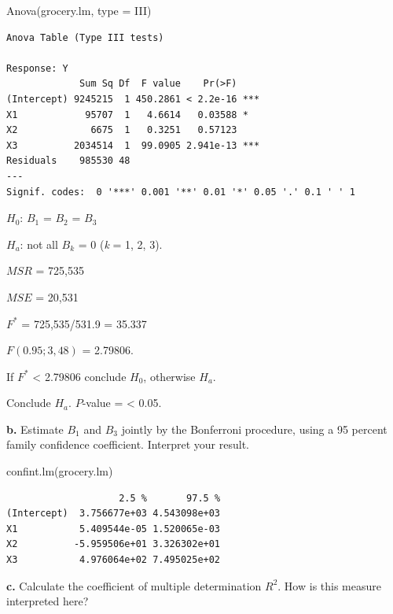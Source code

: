 \documentclass[
  letterpaper,
  DIV=11,
  numbers=noendperiod]{scrartcl}
\newenvironment{Shaded}{\begin{snugshade}}{\end{snugshade}}
\newcommand{\AttributeTok}[1]{\textcolor[rgb]{0.40,0.45,0.13}{#1}}
\newcommand{\FunctionTok}[1]{\textcolor[rgb]{0.28,0.35,0.67}{#1}}
\newcommand{\NormalTok}[1]{\textcolor[rgb]{0.00,0.23,0.31}{#1}}
\newcommand{\StringTok}[1]{\textcolor[rgb]{0.13,0.47,0.30}{#1}}
\begin{document}
\begin{Shaded}
\begin{Highlighting}[]
\FunctionTok{Anova}\NormalTok{(grocery.lm, }\AttributeTok{type =} \StringTok{\textquotesingle{}III\textquotesingle{}}\NormalTok{)}
\end{Highlighting}
\end{Shaded}

\begin{verbatim}
Anova Table (Type III tests)

Response: Y
             Sum Sq Df  F value    Pr(>F)    
(Intercept) 9245215  1 450.2861 < 2.2e-16 ***
X1            95707  1   4.6614   0.03588 *  
X2             6675  1   0.3251   0.57123    
X3          2034514  1  99.0905 2.941e-13 ***
Residuals    985530 48                       
---
Signif. codes:  0 '***' 0.001 '**' 0.01 '*' 0.05 '.' 0.1 ' ' 1
\end{verbatim}

\(H_{0}\): \(B_{1}\) = \(B_{2}\) = \(B_{3}\)

\(H_{a}\): not all \(B_{k}\) = 0 (\emph{k} = 1, 2, 3).

\(MSR\) = 725,535

\(MSE\) = 20,531

\(F^{*}\) = 725,535/531.9 = 35.337

\(F(0.95; 3, 48)\) = 2.79806.

If \(F^{*}\) \textless{} 2.79806 conclude \(H_{0}\), otherwise
\(H_{a}\).

Conclude \(H_{a}\). \(P\)-value = \textless{} 0.05.

\textbf{b.} Estimate \(B_{1}\) and \(B_{3}\) jointly by the Bonferroni
procedure, using a 95 percent family confidence coefficient. Interpret
your result.

\begin{Shaded}
\begin{Highlighting}[]
\FunctionTok{confint.lm}\NormalTok{(grocery.lm)}
\end{Highlighting}
\end{Shaded}

\begin{verbatim}
                    2.5 %       97.5 %
(Intercept)  3.756677e+03 4.543098e+03
X1           5.409544e-05 1.520065e-03
X2          -5.959506e+01 3.326302e+01
X3           4.976064e+02 7.495025e+02
\end{verbatim}

\textbf{c.} Calculate the coefficient of multiple determination
\(R^{2}\). How is this measure interpreted here?
\end{document}
